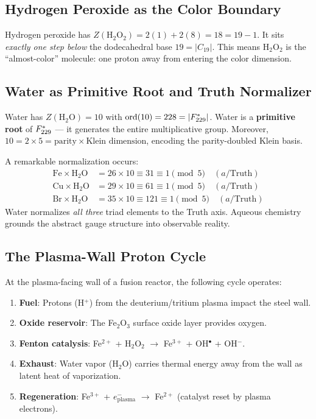 \subsection{Hydrogen Peroxide as the Color Boundary}

Hydrogen peroxide has $Z(\text{H}_2\text{O}_2) = 2(1) + 2(8) = 18 = 19 - 1$. It sits \emph{exactly one step below} the dodecahedral base $19 = |C_{19}|$. This means $\text{H}_2\text{O}_2$ is the ``almost-color'' molecule: one proton away from entering the color dimension.

\subsection{Water as Primitive Root and Truth Normalizer}

Water has $Z(\text{H}_2\text{O}) = 10$ with $\text{ord}(10) = 228 = |F_{229}^*|$. Water is a \textbf{primitive root} of $F_{229}^*$ --- it generates the entire multiplicative group. Moreover, $10 = 2 \times 5 = \text{parity} \times \text{Klein dimension}$, encoding the parity-doubled Klein basis.

A remarkable normalization occurs:
\begin{align}
    \text{Fe} \times \text{H}_2\text{O} &= 26 \times 10 \equiv 31 \equiv 1 \pmod{5} \quad (a/\text{Truth}) \\
    \text{Cu} \times \text{H}_2\text{O} &= 29 \times 10 \equiv 61 \equiv 1 \pmod{5} \quad (a/\text{Truth}) \\
    \text{Br} \times \text{H}_2\text{O} &= 35 \times 10 \equiv 121 \equiv 1 \pmod{5} \quad (a/\text{Truth})
\end{align}
Water normalizes \emph{all three} triad elements to the Truth axis. Aqueous chemistry grounds the abstract gauge structure into observable reality.

\subsection{The Plasma-Wall Proton Cycle}

At the plasma-facing wall of a fusion reactor, the following cycle operates:

\begin{enumerate}
    \item \textbf{Fuel}: Protons (H$^+$) from the deuterium/tritium plasma impact the steel wall.
    \item \textbf{Oxide reservoir}: The Fe$_2$O$_3$ surface oxide layer provides oxygen.
    \item \textbf{Fenton catalysis}: Fe$^{2+}$ + H$_2$O$_2$ $\to$ Fe$^{3+}$ + OH$^\bullet$ + OH$^-$.
    \item \textbf{Exhaust}: Water vapor (H$_2$O) carries thermal energy away from the wall as latent heat of vaporization.
    \item \textbf{Regeneration}: Fe$^{3+}$ + $e^-_{\text{plasma}}$ $\to$ Fe$^{2+}$ (catalyst reset by plasma electrons).
\end{enumerate}

